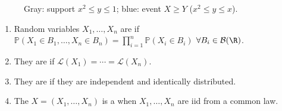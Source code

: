 \begin{figure}[H]
  \centering
  
  \caption{\textcolor{gray!70!black}{Gray}: support $x^2\leq y\leq1$; \textcolor{blue!70!black}{blue}: event $X\geq Y$ ($x^2\leq y\leq x$).}
  \label{fig:parabolic-bivariate-region}
\end{figure}

\begin{definition} \label{def:independent-random-variables-and-iid-samples} 
\begin{enumerate}[label=(\roman*)]
\setlength{\itemsep}{0pt}
\item Random variables $X_1,\ldots,X_n$ are  if $\mathbb{P}(X_1\in B_1,\ldots,X_n\in B_n)=\prod\limits_{i=1}^{n}\mathbb{P}(X_i\in B_i)$ $\forall B_i\in\mathcal{B}(\R)$.
\item They are  if $\mathcal{L}(X_1)=\cdots=\mathcal{L}(X_n)$.
\item They are  if they are independent and identically distributed.
\item The  $X=(X_1,\ldots,X_n)$ is a  when $X_1,\ldots,X_n$ are iid from a common law.
\end{enumerate}
\end{definition}

